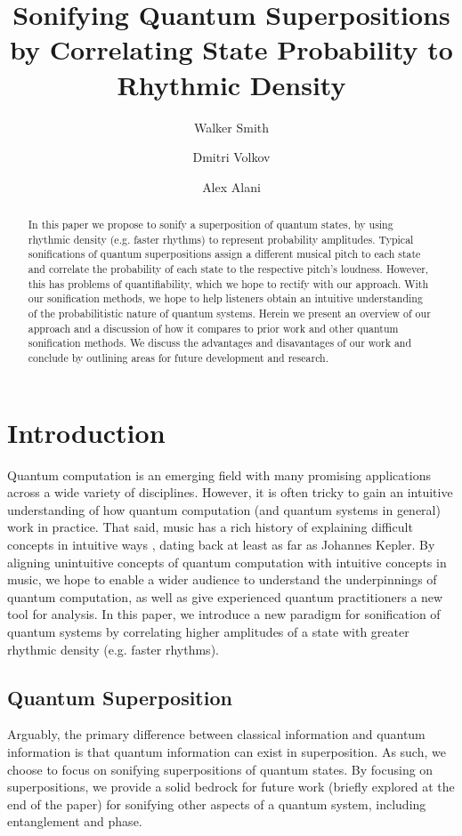 \documentclass[10pt,twocolumn]{article}
\title{Sonifying Quantum Superpositions by Correlating State Probability to Rhythmic Density}
\author{Walker Smith\inst{1} \and
        Dmitri Volkov\inst{1} \and
        Alex Alani\inst{1}}
\begin{document}
\maketitle

\begin{abstract}
In this paper we propose to sonify a superposition of quantum states, by using rhythmic density (e.g. faster rhythms) to represent probability amplitudes. Typical sonifications of quantum superpositions assign a different musical pitch to each state and correlate the probability of each state to the respective pitch’s loudness. However, this has problems of quantifiability, which we hope to rectify with our approach. With our sonification methods, we hope to help listeners obtain an intuitive understanding of the probabilitistic nature of quantum systems. Herein we present an overview of our approach and a discussion of how it compares to prior work and other quantum sonification methods. We discuss the advantages and disavantages of our work and conclude by outlining areas for future development and research.
\end{abstract}

\section{Introduction}

Quantum computation is an emerging field with many promising applications across a wide variety of disciplines\cite{ukpabi2023framework}. However, it is often tricky to gain an intuitive understanding of how quantum computation (and quantum systems in general) work in practice\cite{qcvc}. That said, music has a rich history of explaining difficult concepts in intuitive ways \cite{watzke2022}\cite{smith2022}, dating back at least as far as Johannes Kepler\cite{rodgers1979}. By aligning unintuitive concepts of quantum computation with intuitive concepts in music, we hope to enable a wider audience to understand the underpinnings of quantum computation, as well as give experienced quantum practitioners a new tool for analysis. In this paper, we introduce a new paradigm for sonification of quantum systems by correlating higher amplitudes of a state with greater rhythmic density (e.g. faster rhythms).

\subsection{Quantum Superposition}

Arguably, the primary difference between classical information and quantum information is that quantum information can exist in superposition. As such, we choose to focus on sonifying superpositions of quantum states. By focusing on superpositions, we provide a solid bedrock for future work (briefly explored at the end of the paper) for sonifying other aspects of a quantum system, including entanglement and phase.
\end{document}

